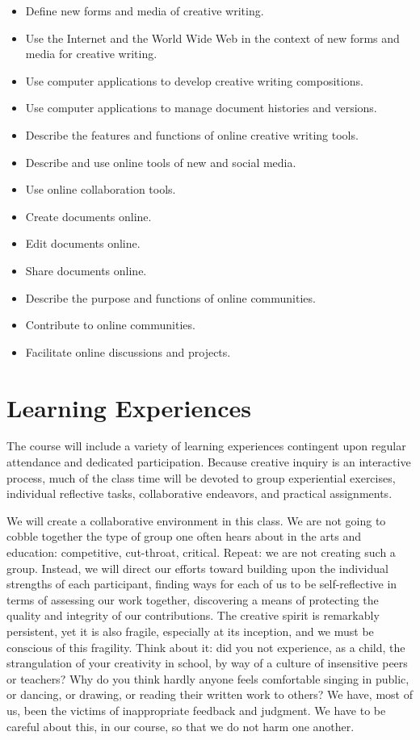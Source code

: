 \documentclass[letterpaper,10pt,headsepline]{scrreprt}
\begin{document}
\begin{itemize}

\item Define new forms and media of creative writing.
\item Use the Internet and the World Wide Web in the context of new forms and media for creative writing.
\item Use computer applications to develop creative writing compositions.
\item Use computer applications to manage document histories and versions.
\item Describe the features and functions of online creative writing tools.
\item Describe and use online tools of new and social media.
\item Use online collaboration tools.
\item Create documents online.
\item Edit documents online.
\item Share documents online.
\item Describe the purpose and functions of online communities.
\item Contribute to online communities.
\item Facilitate online discussions and projects.

\end{itemize}

\section{Learning Experiences}
The course will include a variety of learning experiences contingent upon regular attendance and dedicated participation. Because creative inquiry is an interactive process, much of the class time will be devoted to group experiential exercises, individual reflective tasks, collaborative endeavors, and practical assignments.

We will create a collaborative environment in this class. We are not going to cobble together the type of group one often hears about in the arts and education: competitive, cut-throat, critical. Repeat: we are not creating such a group. Instead, we will direct our efforts toward building upon the individual strengths of each participant, finding ways for each of us to be self-reflective in terms of assessing our work together, discovering a means of protecting the quality and integrity of our contributions. The creative spirit is remarkably persistent, yet it is also fragile, especially at its inception, and we must be conscious of this fragility. Think about it: did you not experience, as a child, the strangulation of your creativity in school, by way of a culture of insensitive peers or teachers? Why do you think hardly anyone feels comfortable singing in public, or dancing, or drawing, or reading their written work to others? We have, most of us, been the victims of inappropriate feedback and judgment. We have to be careful about this, in our course, so that we do not harm one another.
\end{document}
